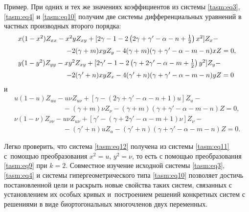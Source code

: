 \smallskip

{\small \sc Пример.} 
При одних и тех же значениях коэффициентов из системы \eqref{tasm:eq3}, \eqref{tasm:eq4} и \eqref{tasm:eq10} получим две системы дифференциальных уравнений в частных производных второго порядка:
\begin{equation}
\begin{array}{l}
x(1-x^{2})    Z_{xx}-x^{2}y   
Z_{xy}+[2\gamma-1-2\left(2\gamma+\gamma'-\alpha-n+\frac{1}{2}\right)   
x^{2}]    Z_{x}-\\[0.2cm]
\hspace{2.5cm} -2(\gamma+m)    xy    Z_{y}-4(\gamma+m)   
(\gamma+\gamma'-\alpha-m-n)    x    Z=0,\\[0.2cm]
y(1-y^{2})    Z_{yy}-xy^{2}   
Z_{xy}+[2\gamma'-1-2\left(\gamma+2\gamma'-\alpha-m+
\frac{1}{2}\right)    y^{2}]    Z_{y}-\\[0.2cm]
\hspace{2.5cm}
-2(\gamma'+n)    xy    Z_{x}-4(\gamma'+n)   
(\gamma+\gamma'-\alpha-m-n)    y    Z=0
\end{array}
\label{tasm:eq11}
\end{equation}
и
\begin{equation}
\begin{array}{l}
u(1-u)    Z_{uu}-u\nu   
Z_{u\nu}+[\gamma-(2\gamma+\gamma'-\alpha-n+1)    u]   
Z_{u}-\\[0.2cm]
\hspace{3cm} -(\gamma+m)    \nu    Z_{\nu}-(\gamma+m)   
(\gamma+\gamma'-\alpha-m-n)    Z=0,\\[0.2cm]
\nu(1-\nu)    Z_{\nu\nu}-u\nu   
Z_{u\nu}+[\gamma'-(\gamma+2\gamma'-\alpha-m+1)    \nu]   
Z_{\nu}-\\[0.2cm]
\hspace{3cm} -(\gamma'+n)    u    Z_{u}-(\gamma'+n)   
(\gamma+\gamma'-\alpha-m-n)    Z=0.
\end{array}
\label{tasm:eq12}
\end{equation}

Легко проверить, что система \eqref{tasm:eq12} получена из системы \eqref{tasm:eq11} с~помощью преобразования $x^{2}=u$, $y^{2}=\nu$, то есть с помощью преобразования \eqref{tasm:eq9} при $k=2$. 
Совместное изучение исходной системы \eqref{tasm:eq3}, \eqref{tasm:eq4} и системы гипергеометрического типа \eqref{tasm:eq10} позволяет достичь постановленной цели и раскрыть новые свойства таких систем, связанных с установлением их особых кривых и~построением решений конкретных систем с решениями в виде биортогональных многочленов двух переменных.

